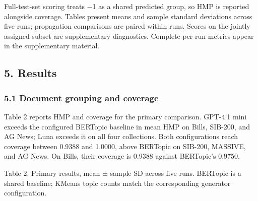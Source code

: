 \documentclass[
  11pt,
  a4paper,
]{article}
\begin{document}
Full-test-set scoring treats \ensuremath{-}1 as a shared predicted group, so HMP is
reported alongside coverage. Tables present means and sample standard
deviations across five runs; propagation comparisons are paired within
runs. Scores on the jointly assigned subset are supplementary
diagnostics. Complete per-run metrics appear in the supplementary
material.

\subsection{5. Results}\label{results}

\subsubsection{5.1 Document grouping and
coverage}\label{document-grouping-and-coverage}

Table 2 reports HMP and coverage for the primary comparison. GPT-4.1
mini exceeds the configured BERTopic baseline in mean HMP on Bills,
SIB-200, and AG News; Luna exceeds it on all four collections. Both
configurations reach coverage between 0.9388 and 1.0000, above BERTopic
on SIB-200, MASSIVE, and AG News. On Bills, their coverage is 0.9388
against BERTopic's 0.9750.


Table 2. Primary results, mean ± sample SD across five runs. BERTopic is
a shared baseline; KMeans topic counts match the corresponding generator
configuration.
\end{document}

